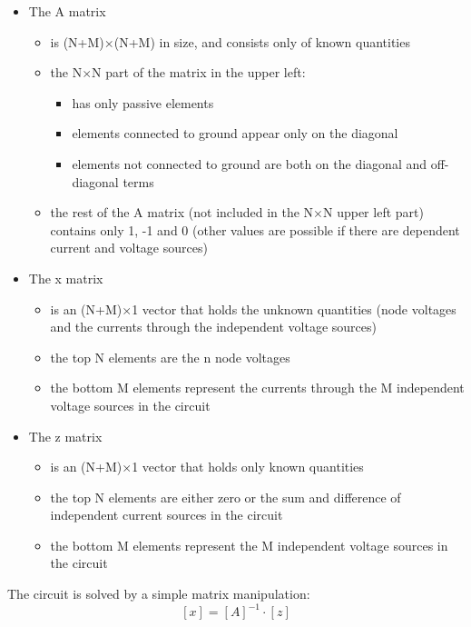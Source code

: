 \begin{itemize}

\item The A matrix
\begin{itemize}
\item
is (N+M)$\times$(N+M) in size, and consists only of known quantities
\item
the N$\times$N part of the matrix in the upper left:
\begin{itemize}
\item
has only passive elements
\item
elements connected to ground appear only on the diagonal
\item
elements not connected to ground are both on the diagonal and
off-diagonal terms
\end{itemize}
\item
the rest of the A matrix (not included in the N$\times$N upper left
part) contains only 1, -1 and 0 (other values are possible if there
are dependent current and voltage sources)
\end{itemize}

\item The x matrix
\begin{itemize}
\item
is an (N+M)$\times$1 vector that holds the unknown quantities (node
voltages and the currents through the independent voltage sources)
\item
the top N elements are the n node voltages
\item
the bottom M elements represent the currents through the M independent
voltage sources in the circuit
\end{itemize}

\item The z matrix
\begin{itemize}
\item
is an (N+M)$\times$1 vector that holds only known quantities
\item
the top N elements are either zero or the sum and difference of
independent current sources in the circuit
\item
the bottom M elements represent the M independent voltage sources in
the circuit
\end{itemize}
\end{itemize}

The circuit is solved by a simple matrix manipulation:
\begin{equation}
\left[x\right] = \left[A\right]^{-1} \cdot \left[z\right]
\end{equation}

